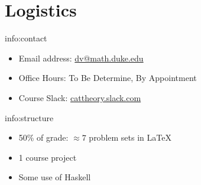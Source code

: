 



\section{Logistics}\label{sec:logistics}

\begin{info}{info:contact}
    \begin{itemize}
        \item Email address: \href{mailto:dv@math.duke.edu}{dv@math.duke.edu}
        \item Office Hours: To Be Determine, By Appointment
        \item Course Slack: \href{cattheory.slack.com}{cattheory.slack.com}
    \end{itemize}
\end{info}

\begin{info}{info:structure}
    \begin{itemize}
        \item 50\% of grade: \( \approx 7 \) problem sets in \LaTeX
        \item 1 course project
        \item Some use of Haskell
    \end{itemize}
\end{info}


